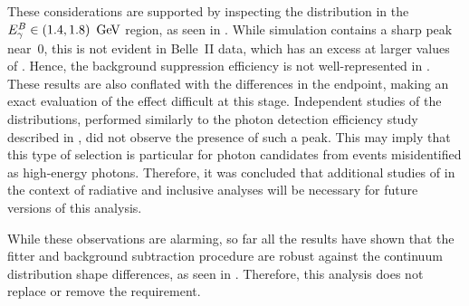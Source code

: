 These considerations are supported by inspecting the \ZMVA distribution in the \mbox{${E^B_{\gamma}}\in(1.4,1.8)~\mathrm{\,Ge\kern -0.1em V}$} region, as seen in .
While simulation contains a sharp peak near~0, this is not evident in Belle~II data, which has an excess at larger values of \ZMVA.
Hence, the background suppression efficiency is not well-represented in \MC.
These results are also conflated with the differences in the \Mbc endpoint, making an exact evaluation of the effect difficult at this stage.
Independent studies of the \ZMVA distributions, performed similarly to the photon detection efficiency study described in , did not observe the presence of such a peak.
This may imply that this type of selection is particular for photon candidates from \BB events misidentified as high-energy photons.
Therefore, it was concluded that additional studies of \ZMVA in the context of radiative and inclusive analyses will be necessary for future versions of this analysis.

While these observations are alarming, so far all the results have shown that the \Mbc fitter and background subtraction procedure are robust against the
continuum \Mbc distribution shape differences, as seen in .
Therefore, this analysis does not replace or remove the \ZMVA requirement.

